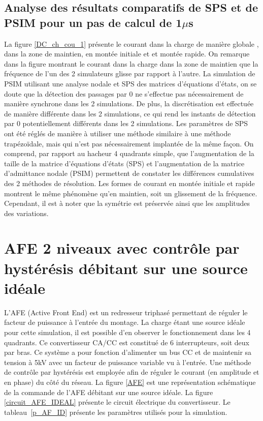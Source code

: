 \clearpage

\subsection{Analyse des résultats comparatifs de SPS et de PSIM pour un pas de calcul de 1$\mu$s}

La figure \ref{DC_ch_cou_1} présente le courant dans la charge de manière globale , dans la zone de maintien, en montée initiale et et montée rapide. On remarque dans la figure montrant le courant dans la charge dans la zone de maintien que la fréquence de l'un des 2 simulateurs glisse par rapport à l'autre. La simulation de PSIM utilisant une analyse nodale et SPS des matrices d'équations d'états, on se doute que la détection des passages par 0 ne s'effectue pas nécessairement de manière synchrone dans les 2 simulations. De plus, la discrétisation est effectuée de manière différente dans les 2 simulations, ce qui rend les instants de détection par 0 potentiellement différents dans les 2 simulations. Les paramètres de SPS ont été réglés de manière à utiliser une méthode similaire à une méthode trapézoïdale, mais qui n'est pas nécessairement implantée de la même façon. On comprend, par rapport au hacheur 4 quadrants simple, que l'augmentation de la taille de la matrice d'équations d'états (SPS) et l'augmentation de la matrice d'admittance nodale (PSIM) permettent de constater les différences cumulatives des 2 méthodes de résolution. Les formes de courant en montée initiale et rapide montrent le même phénomène qu'en maintien, soit un glissement de la fréquence. Cependant, il est à noter que la symétrie est préservée ainsi que les amplitudes des variations.
\section{AFE 2 niveaux avec contrôle par hystérésis débitant sur une source idéale}
L'AFE (Active Front End) est un redresseur triphasé permettant de réguler le facteur de puissance à l'entrée du montage. La charge étant une source idéale pour cette simulation, il est possible d'en observer le fonctionnement dans les 4 quadrants. Ce convertisseur CA/CC est constitué de 6 interrupteurs, soit deux par bras. Ce système a pour fonction d'alimenter un bus CC et de maintenir sa tension à 5kV avec un facteur de puissance variable vu à l'entrée. Une méthode de contrôle par hystérésis est employée afin de réguler le courant (en amplitude et en phase) du côté du réseau. La figure \ref{AFE} est une représentation schématique de la commande de l'AFE débitant sur une source idéale. La figure \ref{circuit_AFE_IDEAL} présente le circuit électrique du convertisseur. Le tableau~\ref{p_AF_ID} présente les paramètres utilisés pour la simulation.

